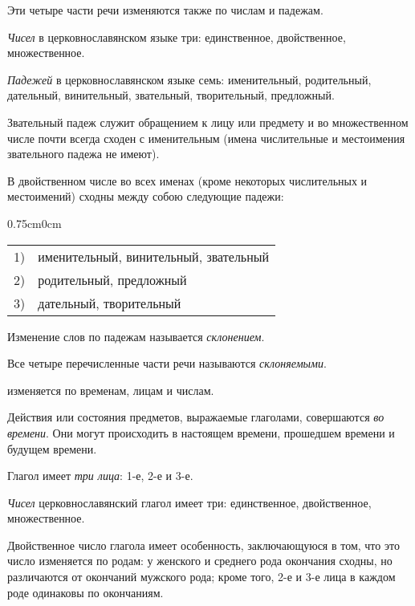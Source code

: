 \documentclass[11pt,a4paper,oneside]{memoir}
\newcommand{\hstbb}{0.75cm}
\begin{document}
    Эти четыре части речи изменяются также по числам и падежам.

    \emph{Чисел} в церковнославянском языке три: единственное, двойственное, множественное.
    
    \emph{Падежей} в церковнославянском языке семь: именительный, родительный, дательный, винительный, звательный, творительный, предложный.
    
    Звательный падеж служит обращением к лицу или предмету и во множественном числе почти всегда сходен с именительным (имена числительные и местоимения звательного падежа не имеют).
    
    В двойственном числе во всех именах (кроме некоторых числительных и местоимений) сходны между собою следующие падежи:
    
    \bigskip\begin{adjustwidth}{\hstbb}{0cm}
        \renewcommand*{\arraystretch}{1.0}
        \begin{tabular}[l]{ll}
            
            1) & именительный, винительный, звательный\\
            2) & родительный, предложный\\
            3) & дательный, творительный\\
            
        \end{tabular}
    \end{adjustwidth}

    \medskip
    Изменение слов по падежам называется \emph{склонением}.
    
    Все четыре перечисленные части речи называются \emph{склоняемыми}.
    
    {} изменяется по временам, лицам и числам.
    
    Действия или состояния предметов, выражаемые глаголами, совершаются \emph{во времени}. Они могут происходить в настоящем времени, прошедшем времени и будущем времени.
    
    Глагол имеет \emph{три лица}: 1-е, 2-е и 3-е.
    
    \emph{Чисел} церковнославянский глагол имеет три: единственное, двойственное, множественное.
    
    Двойственное число глагола имеет особенность, заключающуюся в том, что это число изменяется по родам: у женского и среднего рода окончания сходны, но различаются от окончаний мужского рода; кроме того, 2-е и 3-е лица в каждом роде одинаковы по окончаниям.
    
\end{document}
